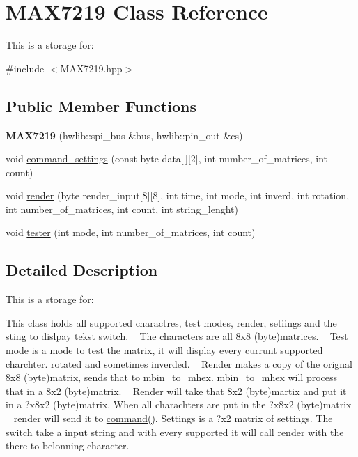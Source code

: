 \hypertarget{class_m_a_x7219}{}\section{M\+A\+X7219 Class Reference}
\label{class_m_a_x7219}


This is a storage for\+:  




{\ttfamily \#include $<$M\+A\+X7219.\+hpp$>$}

\subsection*{Public Member Functions}
\begin{DoxyCompactItemize}
\item 
{\bfseries M\+A\+X7219} (hwlib\+::spi\+\_\+bus \&bus, hwlib\+::pin\+\_\+out \&cs)\hypertarget{class_m_a_x7219_a624c96ba355adf98508467ff5ba1231c}{}\label{class_m_a_x7219_a624c96ba355adf98508467ff5ba1231c}

\item 
void \hyperlink{class_m_a_x7219_ac71364c86fbc0e9ab520c751dfe3aef0}{command\+\_\+settings} (const byte data\mbox{[}$\,$\mbox{]}\mbox{[}2\mbox{]}, int number\+\_\+of\+\_\+matrices, int count)
\item 
void \hyperlink{class_m_a_x7219_a22dc3d4ba386b338de95d622c39e7158}{render} (byte render\+\_\+input\mbox{[}8\mbox{]}\mbox{[}8\mbox{]}, int time, int mode, int inverd, int rotation, int number\+\_\+of\+\_\+matrices, int count, int string\+\_\+lenght)
\item 
void \hyperlink{class_m_a_x7219_a883d2cdecd300170c5e033f2a3cb09cf}{tester} (int mode, int number\+\_\+of\+\_\+matrices, int count)
\end{DoxyCompactItemize}


\subsection{Detailed Description}
This is a storage for\+: 

This class holds all supported charactres, test modes, render, setiings and the sting to dislpay tekst switch. ~\newline
The characters are all 8x8 (byte)matrices. ~\newline
Test mode is a mode to test the matrix, it will display every currunt supported charchter. rotated and sometimes inverded. ~\newline
Render makes a copy of the orignal 8x8 (byte)matrix, sends that to \hyperlink{classmbin__to__mhex}{mbin\+\_\+to\+\_\+mhex}. \hyperlink{classmbin__to__mhex}{mbin\+\_\+to\+\_\+mhex} will process that in a 8x2 (byte)matrix. ~\newline
Render will take that 8x2 (byte)martix and put it in a ?x8x2 (byte)matrix. When all charachters are put in the ?x8x2 (byte)matrix ~\newline
render will send it to \hyperlink{classcommand}{command()}. Settings is a ?x2 matrix of settings. The switch take a input string and with every supported it will call render with the there to belonning character. 

